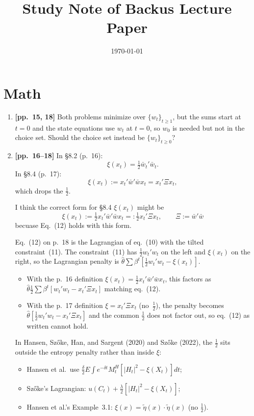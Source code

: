 \documentclass[11pt]{article}
\title{Study Note of Backus Lecture Paper}
\author{}
\date{\today}
\begin{document}
\maketitle

\section{Math}

\begin{enumerate}[label=\textbf{M\arabic*.}, leftmargin=*, itemsep=10pt, listparindent=1em]

\item \textbf{[pp.~15, 18]}
Both problems minimize over $\{w_t\}_{t\geq1}$, but the sums start at $t=0$ and the 
state equations use $w_t$ at $t=0$, so $w_0$ is needed but not in the choice set. 
Should the choice set instead be $\{w_t\}_{t\geq0}$?

\item \textbf{[pp.~16--18]}
In \S8.2 (p.~16):
$$
  \xi(x_t) = \tfrac{1}{2} \bar w_t' \bar w_t.
$$
In \S8.4 (p.~17):
$$
  \xi(x_t) := x_t' \bar w'\bar w x_t = x_t' \Xi x_t,
$$
which drops the $\frac{1}{2}$.  

I think the correct form for \S8.4 $\xi(x_t)$ might be
$$
  \xi(x_t) := \tfrac{1}{2} x_t' \bar w'\bar w x_t =: \tfrac{1}{2} x_t' \Xi x_t, \qquad 
  \Xi :=  \bar w'\bar w
$$
becuase Eq.~(12) holds with this form.

Eq.~(12) on p.~18 is the Lagrangian of eq.~(10) with the tilted constraint~(11).  The constraint~(11) has $\frac{1}{2}w_t'w_t$ on the left and $\xi(x_t)$ on the right, so the Lagrangian penalty is $\hat\theta\sum\beta^t[\frac{1}{2}w_t'w_t - \xi(x_t)]$.  

\begin{itemize}
  \item With the p.~16 definition $\xi(x_t)=\frac{1}{2}x_t'\bar w'\bar w x_t$, this factors as $\hat\theta \frac{1}{2}\sum\beta^t[w_t'w_t - x_t'\Xi x_t]$ matching eq.~(12).
  \item With the p.~17 definition $\xi=x_t'\Xi x_t$ (no~$\frac{1}{2}$), the penalty becomes $\hat\theta[\frac{1}{2}w_t'w_t - x_t'\Xi x_t]$ and the common $\frac{1}{2}$ does not factor out, so eq.~(12) as written cannot hold.
\end{itemize}

In Hansen, Sz\H{o}ke, Han, and Sargent (2020) and Sz\H{o}ke (2022), the $\frac{1}{2}$ sits outside the entropy penalty rather than inside $\xi$:
\begin{itemize}[nosep]
  \item Hansen et al.\ use $\frac{\delta}{2} E \int e^{-\delta t}M_t^H[|H_t|^2-\xi(X_t)] dt$;
  \item Sz\H{o}ke's Lagrangian: $u(C_t)+\frac{\lambda}{2}[|H_t|^2-\xi(X_t)]$;
  \item Hansen et al.'s Example~3.1: $\xi(x)=\tilde\eta(x)\cdot\tilde\eta(x)$ (no $\frac{1}{2}$).
\end{itemize}


\end{enumerate}
\end{document}

